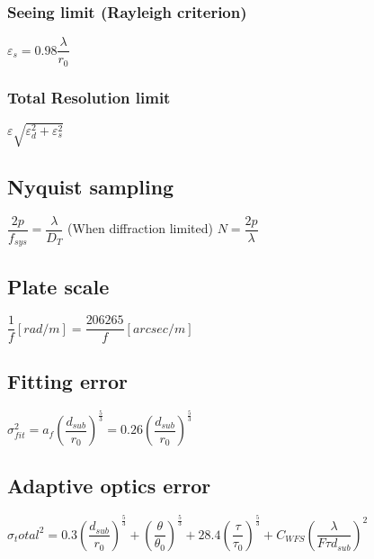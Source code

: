 \subsubsection{Seeing limit (Rayleigh criterion)}			
\begin{itemize}
\itemt \( \varepsilon_s = 0.98 \dfrac{\lambda}{r_0} \)
\end{itemize}

\subsubsection{Total Resolution limit}			
\begin{itemize}
\itemt \( \varepsilon \sqrt{\varepsilon_d^2 + \varepsilon_s^2} \)
\end{itemize}

\subsection{Nyquist sampling}		
\begin{itemize}
\itemt \( \dfrac{2p}{f_{sys}} = \dfrac{\lambda}{D_T} \) \tab (When diffraction limited)
\itemt \( N = \dfrac{2p}{\lambda} \)
\end{itemize}			

\subsection{Plate scale}		
\begin{itemize}
\itemt \( \dfrac{1}{f} [rad/m] = \dfrac{206265}{f} [arcsec/m] \)
\end{itemize}			

\subsection{Fitting error}		
\begin{itemize}
\itemt \( \sigma_{fit}^2 = a_f (\dfrac{d_{sub}}{r_0})^{\frac{5}{3}} = 0.26 (\dfrac{d_{sub}}{r_0})^{\frac{5}{3}} \)
\end{itemize}

\subsection{Adaptive optics error}
\begin{itemize}
\itemt \( \sigma_total^2 = 0.3(\dfrac{d_{sub}}{r_0})^{\frac{5}{3}} + (\dfrac{\theta}{\theta_0})^{\frac{5}{3}} + 28.4(\dfrac{\tau}{\tau_0})^{\frac{5}{3}} + C_{WFS} (\dfrac{\lambda}{F\tau d_{sub}})^2 \)
\end{itemize}
		 
